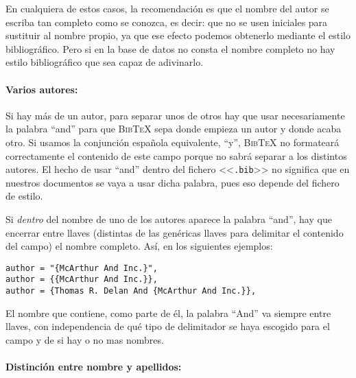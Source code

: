 \documentclass[a4paper,11pt]{article}
\def\btx-{\textsc{Bib\TeX}}
\def\ltr#1-{<<\texttt{#1}>>}
\def\tpf#1-{\ltr.#1-}
\begin{document}
\begin{description}
  En cualquiera de estos casos, la recomendación es que el nombre del autor se
  escriba tan  completo como se  conozca, es decir:  que no se  usen iniciales
  para  sustituir  al nombre  propio,  ya  que  ese efecto  podemos  obtenerlo
  mediante el estilo  bibliográfico. Pero si en la base de  datos no consta el
  nombre completo no hay estilo bibliográfico que sea capaz de adivinarlo.

  \paragraph{Varios autores:}
  \label{sec:caso-en-el}

  Si  hay  más  de  un  autor,  para  separar  unos  de  otros  hay  que  usar
  necesariamente la palabra ``and'' para que \btx- sepa donde empieza un autor
  y donde  acaba otro.  Si  usamos la conjunción española  equivalente, ``y'',
  \btx- no formateará correctamente el contenido de este campo porque no sabrá
  separar a los distintos autores. El hecho de usar ``and'' dentro del fichero
  \tpf  bib- no  significa que  en nuestros  documentos se  vaya a  usar dicha
  palabra, pues eso depende del fichero de estilo.

  Si  \emph{dentro}  del nombre  de  uno de  los  autores  aparece la  palabra
  ``and'', hay  que encerrar entre  llaves (distintas de las  genéricas llaves
  para  delimitar el contenido  del campo)  el nombre  completo.  Así,  en los
  siguientes ejemplos:

  {\small
\begin{verbatim}
author = "{McArthur And Inc.}",
author = {{McArthur And Inc.}},
author = {Thomas R. Delan And {McArthur And Inc.}},
\end{verbatim}
  }

  El nombre  que contiene,  como parte  de él, la  palabra ``And''  va siempre
  entre llaves, con independencia de  qué tipo de delimitador se haya escogido
  para el campo y de si hay o no mas nombres.

  \paragraph{Distinción entre nombre y apellidos:}
  \label{sec:dist-entre-nombre}


\end{description}
\end{document}
